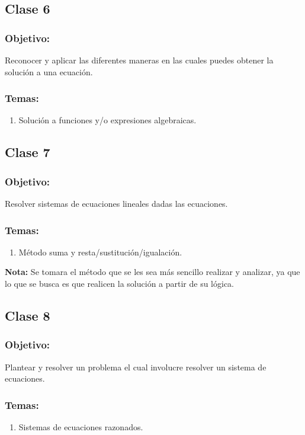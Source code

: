 \documentclass[12pt,letterpaper]{report}
\begin{document}
\subsection*{Clase 6}
\subsubsection*{Objetivo:}
Reconocer y aplicar las diferentes maneras en las cuales puedes obtener la solución a una ecuación.
\subsubsection*{Temas:}
\begin{enumerate}
    \item Solución a funciones y/o expresiones algebraicas.
\end{enumerate}
\subsection*{Clase 7}
\subsubsection*{Objetivo:}
Resolver sistemas de ecuaciones lineales dadas las ecuaciones.
\subsubsection*{Temas:}
\begin{enumerate}
    \item Método suma y resta/sustitución/igualación.
\end{enumerate}
\textbf{Nota:} Se tomara el método que se les sea más sencillo realizar y analizar, ya que lo que se busca es que realicen la solución a partir de su lógica. 
\pagebreak
\subsection*{Clase 8}
\subsubsection*{Objetivo:}
Plantear y resolver un problema el cual involucre resolver un sistema de ecuaciones.
\subsubsection*{Temas:}
\begin{enumerate}
    \item Sistemas de ecuaciones razonados.
\end{enumerate}
\end{document}
